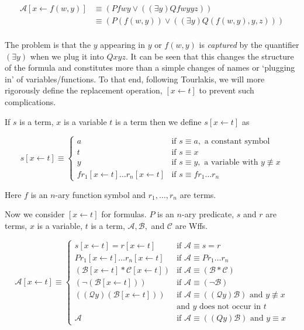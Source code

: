 \documentclass[12pt]{article}
\newcommand{\mc}[1]{\mathcal{#1}}
\begin{document}
\begin{equation}
\begin{split}
\mc{A}[x\leftarrow f(w,y)] &\equiv (Pfwy \lor ((\exists y)Qfwyyz))\\
&\equiv (P(f(w,y)) \lor ((\exists y)Q(f(w,y),y,z)))\\
\end{split}
\end{equation}

The problem is that the $y$ appearing in $y$ or $f(w,y)$ is \textit{captured} by the quantifier $(\exists y)$ when we plug it into $Qxyz$. It can be seen that this changes the structure of the formula and constitutes more than a simple changes of names or `plugging in' of variables/functions. To that end, following Tourlakis, we will more rigorously define the replacement operation, $[x\leftarrow t]$ to prevent such complications.

If $s$ is a term, $x$ is a variable $t$ is a term then we define $s[x\leftarrow t]$ as

\begin{equation}
s[x\leftarrow t] \equiv \begin{cases}
a & \text{if } s \equiv a, \text{ a constant symbol}\\
t & \text{if } s\equiv x\\
y & \text{if } s \equiv y, \text{ a variable with } y \not\equiv x\\
fr_1[x\leftarrow t]\ldots r_n[x\leftarrow t] & \text{if } s\equiv fr_1\ldots r_n
\end{cases}
\end{equation}

Here $f$ is an $n$-ary function symbol and $r_1, \ldots, r_n$ are terms.

Now we consider $[x\leftarrow t]$ for formulas. $P$ is an $n$-ary predicate, $s$ and $r$ are terms, $x$ is a variable, $t$ is a term, $\mc{A}, \mc{B},$ and $\mc{C}$ are Wffs.

\begin{equation}
\mc{A}[x\leftarrow t] \equiv \begin{cases}
s[x\leftarrow t] = r[x\leftarrow t] & \text{if } \mc{A}\equiv s=r\\
Pr_1[x\leftarrow t]\ldots r_n[x\leftarrow t] & \text{if } \mc{A}\equiv Pr_1\ldots r_n\\
(\mc{B}[x\leftarrow t] \ast \mc{C}[x\leftarrow t]) & \text{if } \mc{A} \equiv (\mc{B} \ast \mc{C})\\
(\lnot (\mc{B}[x\leftarrow t])) & \text{if } \mc{A} \equiv (\lnot \mc{B})\\
((\mc{Q} y)(\mc{B}[x\leftarrow t])) & \text{if } \mc{A} \equiv ((\mc{Q} y)\mc{B}) \text{ and $y\not \equiv x$}\\
 & \text{and $y$ does not occur in $t$ }\\
 \mc{A} & \text{if } \mc{A} \equiv ((Q y)\mc{B}) \text{ and $y\equiv x$}
\end{cases}
\end{equation}
\end{document}
